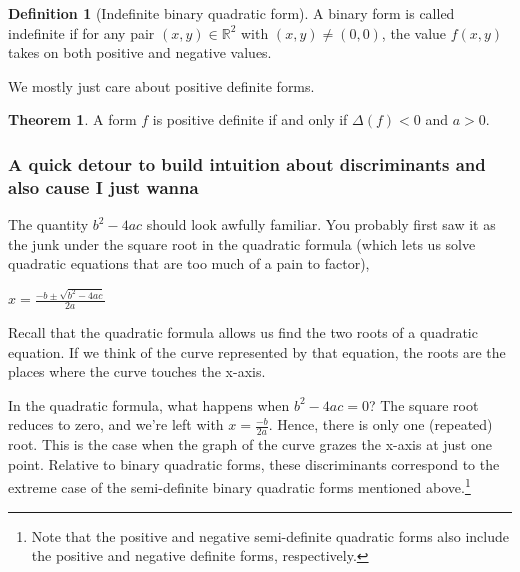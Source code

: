 \documentclass{article}
\theoremstyle{definition}
\newtheorem{definition}{Definition}[section]
\theoremstyle{theorem}
\newtheorem{theorem}{Theorem}[section]
\theoremstyle{example}
\theoremstyle{corollary}
\begin{document}
\bigskip

\theoremstyle{definition}
\begin{definition}[Indefinite binary quadratic form]
A binary form is called indefinite if for any pair \((x, y) \in \mathbb{R}^{2}\) with \((x, y) \ne (0, 0)\), the value \(f(x, y)\) takes on both positive and negative values.
\end{definition}

\bigskip

We mostly just care about positive definite forms.

\bigskip

\theoremstyle{theorem}
\begin{theorem}
A form \(f\) is positive definite if and only if \(\Delta(f) < 0\) and \(a > 0\).
\end{theorem}

\bigskip







\bigskip

\subsubsection{A quick detour to build intuition about discriminants and also cause I just wanna}

\bigskip

The quantity \(b^{2} - 4ac\) should look awfully familiar. You probably first saw it as the junk under the square root in the quadratic formula (which lets us solve quadratic equations that are too much of a pain to factor),
\begin{center}
\(x = \frac{-b \pm \sqrt{b^{2} - 4ac}}{2a}\)
\end{center}

\bigskip

Recall that the quadratic formula allows us find the two roots of a quadratic equation. If we think of the curve represented by that equation, the roots are the places where the curve touches the x-axis.

\bigskip

In the quadratic formula, what happens when \(b^{2} - 4ac = 0\)? The square root reduces to zero, and we're left with \(x = \frac{-b}{2a}\). Hence, there is only one (repeated) root. This is the case when the graph of the curve grazes the x-axis at just one point. Relative to binary quadratic forms, these discriminants correspond to the extreme case of the semi-definite binary quadratic forms mentioned above.\footnote{Note that the positive and negative semi-definite quadratic forms also include the positive and negative definite forms, respectively.}
\end{document}
